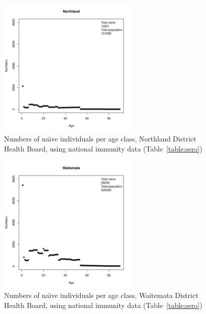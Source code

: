 \documentclass{article}
\begin{document}
\begin{figure}[H]
     \begin{center}
     \includegraphics[width=0.6\textwidth]{dhb1.pdf}
     \end{center}
     \caption{Numbers of na\"{\i}ve individuals per age class, Northland District Health Board, using national immunity data (Table~\autoref{table:sero})}
     \label{fig:Northland}
\end{figure}


\begin{figure}[H]
     \begin{center}
     \includegraphics[width=0.6\textwidth]{dhb2.pdf}
     \end{center}
     \caption{Numbers of na\"{\i}ve individuals per age class, Waitemata District Health Board, using national immunity data (Table~\autoref{table:sero})}
     \label{fig:Waitemata}
\end{figure}
\end{document}
